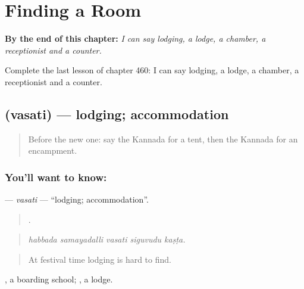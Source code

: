 
\chapter{Finding a Room}
\label{ch:ka-finding-a-room}

\begin{chapteropening}
\textbf{By the end of this chapter:} \emph{I can say lodging, a lodge, a chamber, a receptionist and a counter.}

Complete the last lesson of chapter 460: I can say lodging, a lodge, a chamber, a receptionist and a counter.
\end{chapteropening}

\section[\texorpdfstring{\kn{ವಸತಿ} (vasati)}{ವಸತಿ (vasati)}]{ (vasati) — lodging; accommodation}

\label{lesson:KA-C460-vasati}



\begin{quote}
Before the new one: say the Kannada for a tent, then the Kannada for an encampment.
\end{quote}

\subsection*{You'll want to know: }
\textbf{} — \emph{vasati} — \textquotedblleft{}lodging; accommodation\textquotedblright{}.

\begin{quote}
    .
\end{quote}

\begin{quote}
\emph{habbada samayadalli vasati siguvudu kaṣṭa.}
\end{quote}

\begin{quote}
At festival time lodging is hard to find.
\end{quote}

 , a boarding school; , a lodge.

